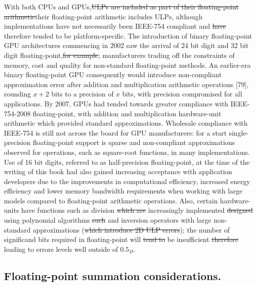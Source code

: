 \documentclass[7pt]{article}
\begin{document}
With both CPUs and GPUs,\st{ULPs are included as part of their floating-point arithmetic}their floating-point arithmetic includes ULPs, although implementations have not necessarily been IEEE-754 compliant and \st{have} therefore  tended to be platform-specific. The introduction of binary floating-point GPU architectures commencing in 2002 saw the arrival of 24 bit digit and 32 bit digit floating-point,\st{for example}; manufacturers trading off the constraints of memory, cost and quality for non-standard floating-point methods.  An earlier-era binary floating-point GPU consequently would introduce non-compliant approximation error after addition and multiplication arithmetic operations  [79], rounding $x+2$ bits to a precision of $x$ bits, with precision compromised for all applications. By 2007, GPUs had tended towards greater compliance with IEEE-754-2008 floating-point, with addition and multiplication hardware-unit arithmetic which provided standard approximations. Wholesale compliance with IEEE-754 is still not across the board for GPU manufacturers: for a start single-precision floating-point support is sparse and non-compliant approximations observed for operations, such as square-root functions, in many implementations. Use of 16 bit digits, referred to as half-precision floating-point, at the time of the writing of this book had also gained increasing acceptance with application developers due to the improvements in computational efficiency, increased energy efficiency and lower memory bandwidth requirements when working with large models compared to floating-point arithmetic operations. Also, certain hardware-units have functions such as division \st{which are} increasingly implemented \st{designed} using polynomial algorithms \st{such} and inversion operators with large non-standard approximations (\st{which introduce 2D ULP errors}); the number of significand bits required in floating-point will \st{tend to} be insufficient \st{therefore} leading to errors levels well outside of $0.5_D$.

\subsection*{Floating-point summation considerations.}
\end{document}
